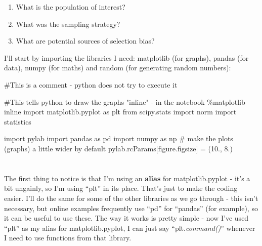 \documentclass[
  letterpaper,
  DIV=11,
  numbers=noendperiod]{scrreprt}
\newenvironment{Shaded}{\begin{snugshade}}{\end{snugshade}}
\newcommand{\CommentTok}[1]{\textcolor[rgb]{0.37,0.37,0.37}{#1}}
\newcommand{\FloatTok}[1]{\textcolor[rgb]{0.68,0.00,0.00}{#1}}
\newcommand{\ImportTok}[1]{\textcolor[rgb]{0.00,0.46,0.62}{#1}}
\newcommand{\NormalTok}[1]{\textcolor[rgb]{0.00,0.23,0.31}{#1}}
\newcommand{\OperatorTok}[1]{\textcolor[rgb]{0.37,0.37,0.37}{#1}}
\newcommand{\StringTok}[1]{\textcolor[rgb]{0.13,0.47,0.30}{#1}}
\providecommand{\tightlist}{%
  \setlength{\itemsep}{0pt}\setlength{\parskip}{0pt}}\usepackage{longtable,booktabs,array}
\begin{document}
\begin{enumerate}
\def\labelenumi{\arabic{enumi})}
\tightlist
\item
  What is the population of interest?
\item
  What was the sampling strategy?
\item
  What are potential sources of selection bias?
\end{enumerate}

I'll start by importing the libraries I need: matplotlib (for graphs),
pandas (for data), numpy (for maths) and random (for generating random
numbers):

\begin{Shaded}
\begin{Highlighting}[]
\CommentTok{\#This is a comment {-} python does not try to execute it}

\CommentTok{\#This tells python to draw the graphs "inline" {-} in the notebook}
\OperatorTok{\%}\NormalTok{matplotlib inline  }
\ImportTok{import}\NormalTok{ matplotlib.pyplot }\ImportTok{as}\NormalTok{ plt}
\ImportTok{from}\NormalTok{ scipy.stats }\ImportTok{import}\NormalTok{ norm}
\ImportTok{import}\NormalTok{ statistics}

\ImportTok{import}\NormalTok{ pylab}
\ImportTok{import}\NormalTok{ pandas }\ImportTok{as}\NormalTok{ pd}
\ImportTok{import}\NormalTok{ numpy }\ImportTok{as}\NormalTok{ np}
\CommentTok{\# make the plots (graphs) a little wider by default}
\NormalTok{pylab.rcParams[}\StringTok{\textquotesingle{}figure.figsize\textquotesingle{}}\NormalTok{] }\OperatorTok{=}\NormalTok{ (}\FloatTok{10.}\NormalTok{, }\FloatTok{8.}\NormalTok{)}
\end{Highlighting}
\end{Shaded}

\hypertarget{section}{%
\section{}\label{section}}

The first thing to notice is that I'm using an \textbf{alias} for
matplotlib.pyplot - it's a bit ungainly, so I'm using ``plt'' in its
place. That's just to make the coding easier. I'll do the same for some
of the other libraries as we go through - this isn't necessary, but
online examples frequently use ``pd'' for ``pandas'' (for example), so
it can be useful to use these. The way it works is pretty simple - now
I've used ``plt'' as my alias for matplotlib.pyplot, I can just say
``plt.\emph{command()}'' whenever I need to use functions from that
library.
\end{document}

